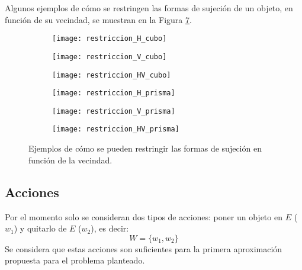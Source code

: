 Algunos ejemplos de cómo se restringen las formas de sujeción de un objeto, en función de su vecindad, se muestran en la Figura \ref{fig:restricciones_agarre}.
%
\begin{figure}[H]
	\def\hsep{12pt}%
	\captionsetup[subfigure]{width=\textwidth}%
	\begin{subfigure}{0.31\textwidth}
		\texttt{[image: restriccion\_H\_cubo]}%
		\label{subfig:restriccion_H_cubo}%
	\end{subfigure}%
	\hspace{\hsep}%
	\begin{subfigure}{0.31\textwidth}
		\texttt{[image: restriccion\_V\_cubo]}%
		\label{subfig:restriccion_V_cubo}%
	\end{subfigure}%
	\hspace{\hsep}%
	\begin{subfigure}{0.31\textwidth}
		\texttt{[image: restriccion\_HV\_cubo]}%
		\label{subfig:restriccion_HV_cubo}%
	\end{subfigure}%
	
	\vspace{0.7cm}
	\begin{subfigure}{0.31\textwidth} 
		\texttt{[image: restriccion\_H\_prisma]}%
		\label{subfig:restriccion_H_prisma}
	\end{subfigure}%
	\hspace{\hsep}%
	\begin{subfigure}{0.31\textwidth}
		\texttt{[image: restriccion\_V\_prisma]}%
		\label{subfig:restriccion_V_prisma}
	\end{subfigure}%
	\hspace{\hsep}%
	\begin{subfigure}{0.31\textwidth}
		\texttt{[image: restriccion\_HV\_prisma]}%
		\label{subfig:restriccion_HV_prisma}%
	\end{subfigure}%
	\caption{Ejemplos de cómo se pueden restringir las formas de sujeción en función de la vecindad.}%
	\label{fig:restricciones_agarre}%
\end{figure}
%
%
\subsection{Acciones}
\label{subsec:acciones}
%
%
Por el momento solo se consideran dos tipos de acciones: poner un objeto en $E$ ($w_1$) y quitarlo de $E$ ($w_2$), es decir:
%
\begin{equation}
	\label{eq:acciones_usadas}
	W = \{w_1, w_2\}
\end{equation}
%
Se considera que estas acciones son suficientes para la primera aproximación propuesta para el problema planteado.
%
%
